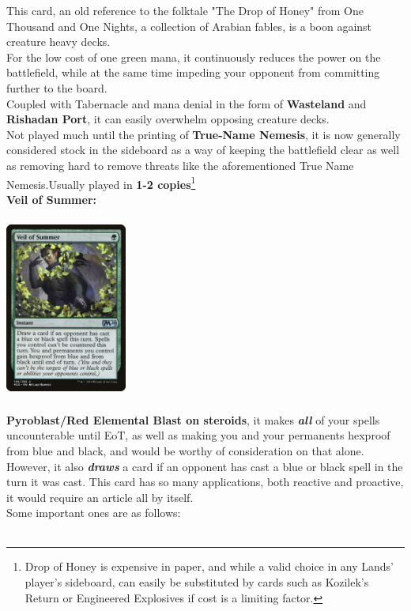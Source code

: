 \documentclass{report}
\begin{document}
This card, an old reference to the folktale "The Drop of Honey" from One Thousand and One Nights, a collection of Arabian fables, is a boon against creature heavy decks.\\For the low cost of one green mana, it continuously reduces the power on the battlefield, while at the same time impeding your opponent from committing further to the board.\\Coupled with Tabernacle and mana denial in the form of \textbf{Wasteland} and \textbf{Rishadan Port}, it can easily overwhelm opposing creature decks.\\Not played much until the printing of \textbf{True-Name Nemesis}, it is now generally considered stock in the sideboard as a way of keeping the battlefield clear as well as removing hard to remove threats like the aforementioned True Name Nemesis.Usually played in \textbf{1-2 copies}\footnote{Drop of Honey is expensive in paper, and while a valid choice in any Lands' player's sideboard, can easily be substituted by cards such as Kozilek's Return or Engineered Explosives if cost is a limiting factor.}\\
\newpage
\textbf{Veil of Summer:\\}
\begin{center}
\includegraphics [width = 4cm, height = 6cm] {veil-of-summer}
\end{center}
\textbf{Pyroblast/Red Elemental Blast on steroids}, it makes \textbf{\emph{all}} of your spells uncounterable until EoT, as well as making you and your permanents hexproof from blue and black, and would be worthy of consideration on that alone.\\ However, it also \textbf{\emph{draws}} a card if an opponent has cast a blue or black spell in the turn it was cast. This card has so many applications, both reactive and proactive, it would require an article all by itself.\\Some important ones are as follows:\\\\
\end{document}
